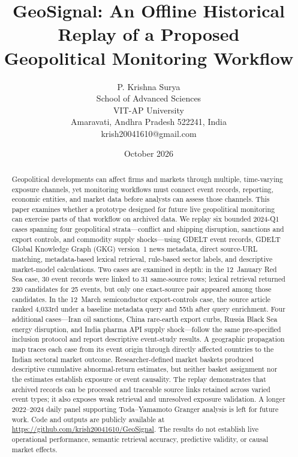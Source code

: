 \documentclass[10pt,a4paper,twocolumn]{article}
\title{GeoSignal: An Offline Historical Replay of a Proposed\\Geopolitical Monitoring Workflow}
\author{P. Krishna Surya\\
\small School of Advanced Sciences\\
\small VIT-AP University\\
\small Amaravati, Andhra Pradesh 522241, India\\
\small krish20041610@gmail.com}
\date{October 2026}
\begin{document}
\maketitle

\begin{abstract}
Geopolitical developments can affect firms and markets through multiple, time-varying exposure channels, yet monitoring workflows must connect event records, reporting, economic entities, and market data before analysts can assess those channels. This paper examines whether a prototype designed for future live geopolitical monitoring can exercise parts of that workflow on archived data. We replay six bounded 2024-Q1 cases spanning four geopolitical strata---conflict and shipping disruption, sanctions and export controls, and commodity supply shocks---using GDELT event records, GDELT Global Knowledge Graph (GKG) version~1 news metadata, direct source-URL matching, metadata-based lexical retrieval, rule-based sector labels, and descriptive market-model calculations. Two cases are examined in depth: in the 12~January Red Sea case, 30 event records were linked to 31 same-source rows; lexical retrieval returned 230 candidates for 25 events, but only one exact-source pair appeared among those candidates. In the 12~March semiconductor export-controls case, the source article ranked 4{,}033rd under a baseline metadata query and 55th after query enrichment. Four additional cases---Iran oil sanctions, China rare-earth export curbs, Russia Black Sea energy disruption, and India pharma API supply shock---follow the same pre-specified inclusion protocol and report descriptive event-study results. A geographic propagation map traces each case from its event origin through directly affected countries to the Indian sectoral market outcome. Researcher-defined market baskets produced descriptive cumulative abnormal-return estimates, but neither basket assignment nor the estimates establish exposure or event causality. The replay demonstrates that archived records can be processed and traceable source links retained across varied event types; it also exposes weak retrieval and unresolved exposure validation. A longer 2022--2024 daily panel supporting Toda--Yamamoto Granger analysis is left for future work. Code and outputs are publicly available at \url{https://github.com/krish20041610/GeoSignal}. The results do not establish live operational performance, semantic retrieval accuracy, predictive validity, or causal market effects.
\end{abstract}
\end{document}
